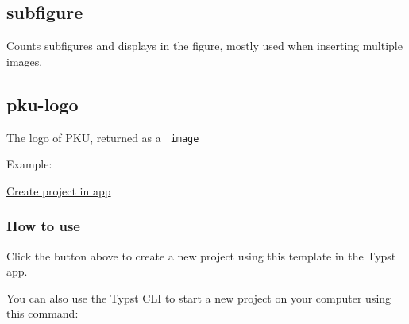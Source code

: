 \subsection{subfigure}\label{subfigure}

Counts subfigures and displays in the figure, mostly used when inserting
multiple images.

\begin{Shaded}
\begin{Highlighting}[]
\end{Highlighting}
\end{Shaded}

\subsection{pku-logo}\label{pku-logo}

The logo of PKU, returned as a \texttt{\ image\ }

\begin{Shaded}
\begin{Highlighting}[]
\end{Highlighting}
\end{Shaded}

Example:

\begin{Shaded}
\begin{Highlighting}[]
\end{Highlighting}
\end{Shaded}

\href{/app?template=meppp&version=0.2.1}{Create project in app}

\subsubsection{How to use}\label{how-to-use}

Click the button above to create a new project using this template in
the Typst app.

You can also use the Typst CLI to start a new project on your computer
using this command:

